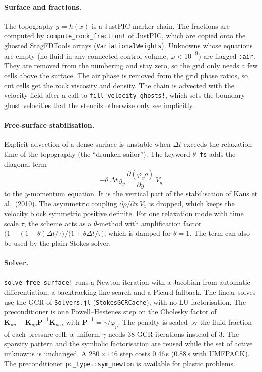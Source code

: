 \documentclass[11pt,a4paper]{article}
\begin{document}
\paragraph{Surface and fractions.} The topography $y=h(x)$ is a JustPIC marker chain. The fractions are computed by \texttt{compute\_rock\_fraction!} of JustPIC, which are copied onto the ghosted StagFDTools arrays (\texttt{VariationalWeights}). Unknowns whose equations are empty (no fluid in any connected control volume, $\varphi<10^{-9}$) are flagged \texttt{:air}. They are removed from the numbering and stay zero, so the grid only needs a few cells above the surface. The air phase is removed from the grid phase ratios, so cut cells get the rock viscosity and density. The chain is advected with the velocity field after a call to \texttt{fill\_velocity\_ghosts!}, which sets the boundary ghost velocities that the stencils otherwise only see implicitly.

\paragraph{Free-surface stabilisation.} Explicit advection of a dense surface is unstable when $\Delta t$ exceeds the relaxation time of the topography (the ``drunken sailor''). The keyword \texttt{\ensuremath{\theta}\_fs} adds the diagonal term
\begin{equation}
-\theta\,\Delta t\, g_y\, \frac{\partial(\varphi_c\rho)}{\partial y}\, V_y
\end{equation}
to the $y$-momentum equation. It is the vertical part of the stabilisation of Kaus et al.\ (2010). The asymmetric coupling $\partial\rho/\partial x\,V_x$ is dropped, which keeps the velocity block symmetric positive definite. For one relaxation mode with time scale $\tau$, the scheme acts as a $\theta$-method with amplification factor $\bigl(1-(1-\theta)\Delta t/\tau\bigr)/\bigl(1+\theta\Delta t/\tau\bigr)$, which is damped for $\theta=1$. The term can also be used by the plain Stokes solver.

\paragraph{Solver.} \texttt{solve\_free\_surface!} runs a Newton iteration with a Jacobian from automatic differentiation, a backtracking line search and a Picard fallback. The linear solves use the GCR of \texttt{Solvers.jl} (\texttt{StokesGCRCache}), with no LU factorisation. The preconditioner is one Powell--Hestenes step on the Cholesky factor of $\mathbf K_{uu}-\mathbf K_{up}\mathbf P^{-1}\mathbf K_{pu}$, with $\mathbf P^{-1}=\gamma/\varphi_p$. The penalty is scaled by the fluid fraction of each pressure cell: a uniform $\gamma$ needs 38 GCR iterations instead of 3. The sparsity pattern and the symbolic factorisation are reused while the set of active unknowns is unchanged. A $280\times146$ step costs 0.46\,s (0.88\,s with UMFPACK). The preconditioner \texttt{pc\_type=:sym\_newton} is available for plastic problems.
\end{document}
